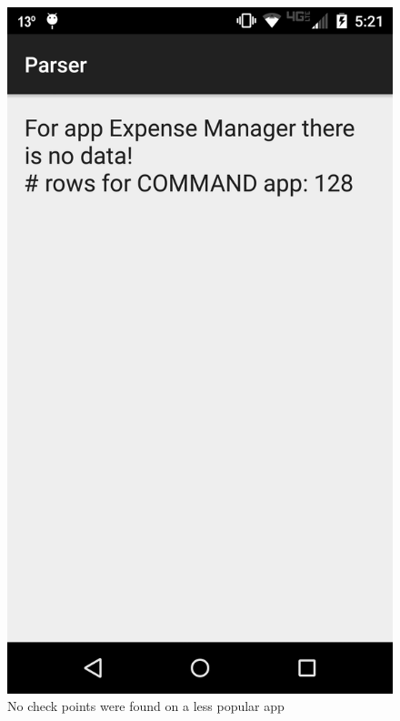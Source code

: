 \begin{figure}[tb]
\centering
	\includegraphics[scale=0.12]{images/nochecks}
	\caption{No check points were found on a less popular app}
	\label{fig:nochecks}
\end{figure}

